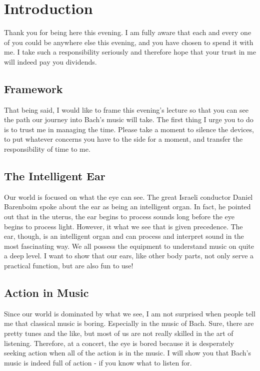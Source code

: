 
\chapter{Introduction}

Thank you for being here this evening. I am fully aware that each and every one of you could be anywhere else this evening, and you have chosen to spend it with me. I take such a responsibility seriously and therefore hope that your trust in me will indeed pay you dividends.

\section{Framework}
That being said, I would like to frame this evening's lecture so that you can see the path our journey into Bach's music will take. The first thing I urge you to do is to trust me in managing the time. Please take a moment to silence the devices, to put whatever concerns you have to the side for a moment, and transfer the responsibility of time to me.

\section{The Intelligent Ear}
Our world is focused on what the eye can see. The great Israeli conductor Daniel Barenboim spoke about the ear as being an intelligent organ. In fact, he pointed out that in the uterus, the ear begins to process sounds long before the eye begins to process light. However, it what we see that is given precedence. The ear, though, is an intelligent organ and can process and interpret sound in the most fascinating way. We all possess the equipment to understand music on quite a deep level. I want to show that our ears, like other body parts, not only serve a practical function, but are also fun to use!

\section{Action in Music}
Since our world is dominated by what we see, I am not surprised when people tell me that classical music is boring. Especially in the music of Bach. Sure, there are pretty tunes and the like, but most of us are not really skilled in the art of listening. Therefore, at a concert, the eye is bored because it is desperately seeking action when all of the action is in the music. I will show you that Bach's music is indeed full of action - if you know what to listen for.